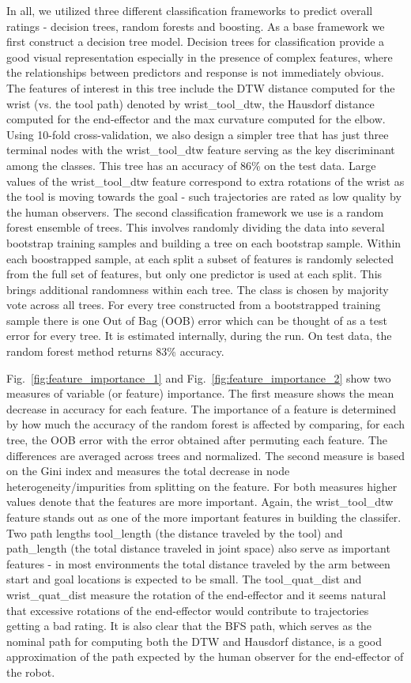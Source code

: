 \documentclass[letterpaper, 10 pt, conference]{ieeeconf}  %
\begin{document}
In all, we utilized three different classification frameworks to predict overall ratings - decision trees, random forests and boosting. As a base framework we first construct a decision tree model.  Decision trees for classification provide a good visual representation especially in the presence of complex features, where the relationships between predictors and response is not immediately obvious. The features of interest in this tree include the DTW distance computed for the wrist (vs. the tool path) denoted by wrist\_tool\_dtw, the Hausdorf distance computed for the end-effector and the max curvature computed for the elbow. Using 10-fold cross-validation, we also design a simpler tree that has just three terminal nodes with the wrist\_tool\_dtw feature serving as the key discriminant among the classes. This tree has an accuracy of 86\% on the test data. Large values of the wrist\_tool\_dtw feature correspond to extra rotations of the wrist as the tool is moving towards the goal - such trajectories are rated as low quality by the human observers. 
The second classification framework we use is a random forest ensemble of trees. This involves randomly dividing the data into several bootstrap training samples and building a tree on each bootstrap sample. Within each boostrapped sample, at each split a subset of features is randomly selected from the full set of features, but only one predictor is used at each split. This brings additional randomness within each tree. The class is chosen by majority vote across all trees. For every tree constructed from a bootstrapped training sample there is one Out of Bag (OOB) error which can be thought of as a test error for every tree. It is estimated internally, during the run. On test data, the random forest method returns 83\% accuracy. 

Fig.~\ref{fig:feature_importance_1} and Fig.~\ref{fig:feature_importance_2} show two measures of variable (or feature) importance. The first measure shows the mean decrease in accuracy for each feature. The importance of a feature is determined by how much the accuracy of the random forest is affected by comparing, for each tree, the OOB error with the error obtained after permuting each feature. The differences are averaged across trees and normalized.  The second measure is based on the Gini index and measures the total decrease in node heterogeneity/impurities from splitting on the feature.  For both measures higher values denote that the features are more important. Again, the wrist\_tool\_dtw feature stands out as one of the more important features in building the classifer. Two path lengths tool\_length (the distance traveled by the tool) and path\_length (the total distance traveled in joint space) also serve as important features - in most environments the total distance traveled by the arm between start and goal locations is expected to be small. The tool\_quat\_dist and wrist\_quat\_dist measure the rotation of the end-effector and it seems natural that excessive rotations of the end-effector would contribute to trajectories getting a bad rating. It is also clear that the BFS path, which serves as the nominal path for computing both the DTW and Hausdorf distance, is a good approximation of the path expected by the human observer for the end-effector of the robot. 
\end{document}
